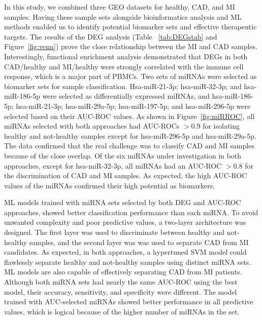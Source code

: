 \documentclass[sn-mathphys,Numbered]{sn-jnl}%
\theoremstyle{thmstyleone}%
\theoremstyle{thmstyletwo}%
\theoremstyle{thmstylethree}%
\begin{document}
In this study, we combined three GEO datasets for healthy, CAD, and MI
samples. Having these sample sets alongside bioinformatics analysis and
ML methods enabled us to identify potential biomarker sets and effective
therapeutic targets. The results of the DEG analysis (Table
~\ref{tab:DEGstab} and Figure~\ref{fig:venn}) prove the close
relationship between the MI and CAD samples. Interestingly, functional
enrichment analysis demonstrated that DEGs in both CAD/healthy and
MI/healthy were strongly correlated with the immune cell response, which
is a major part of PBMCs. Two sets of miRNAs were selected as biomarker
sets for sample classification. Hsa-miR-21-3p; hsa-miR-32-3p; and hsa-miR-186-5p were
selected as differentially expressed miRNAs, and hsa-miR-186-5p; hsa-miR-21-3p;
hsa-miR-29a-5p; hsa-miR-197-5p; and hsa-miR-296-5p were selected based on their AUC-ROC
values. As shown in Figure~\ref{fig:miRROC}, all miRNAs selected with
both approaches had AUC-ROCs $> 0.9$ for isolating healthy and
not-healthy samples except for hsa-miR-296-5p and hsa-miR-29a-5p. The data confirmed
that the real challenge was to classify CAD and MI samples because of
the close overlap. Of the six miRNAs under investigation in both
approaches, except for hsa-miR-32-3p, all miRNAs had an AUC-ROC $> 0.8$ for
the discrimination of CAD and MI samples. As expected, the high AUC-ROC
values of the miRNAs confirmed their high potential as biomarkers.

ML models trained with miRNA sets selected by both DEG and AUC-ROC
approaches, showed better classification performance than each miRNA. To
avoid unwanted complexity and poor predictive values, a two-layer
architecture was designed. The first layer was used to discriminate
between healthy and not-healthy samples, and the second layer was was
used to separate CAD from MI candidates. As expected, in both
approaches, a hypertuned SVM model could flawlessly separate healthy and
not-healthy samples using distinct miRNA sets. ML models are also
capable of effectively separating CAD from MI patients. Although both
miRNA sets had nearly the same AUC-ROC using the best model, their
accuracy, sensitivity, and specificity were different. The model trained
with AUC-selected miRNAs showed better performance in all predictive
values, which is logical because of the higher number of miRNAs in the
set.
\end{document}

